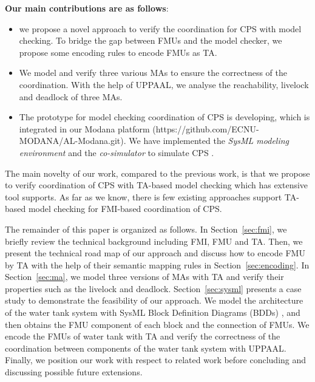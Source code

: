 \textbf{Our main contributions are as follows}:
\begin{itemize}
\item
we propose a novel approach to verify the coordination for CPS with model checking. To bridge the gap between FMUs and the model checker, we propose some encoding rules to encode FMUs as TA.
\item
We model and verify three various MAs to ensure the correctness of the coordination. With the help of UPPAAL, we analyse the reachability, livelock and deadlock of three MAs.
\item
The prototype for model checking coordination of CPS is developing, which is integrated in our Modana platform \cite{Cheng2015Modana}(https://github.com/ECNU-MODANA/AL-Modana.git). We have implemented the \textit{SysML modeling environment} and the \textit{co-simulator} to simulate CPS \cite{Fritzson1998Modelica}.
\end{itemize}
The main novelty of our work, compared to the previous work, is that we propose to verify coordination of CPS with TA-based model checking which has extensive tool supports. As far as we know, there is few existing approaches support TA-based model checking for FMI-based coordination of CPS.

The remainder of this paper is organized as follows. In Section~\ref{sec:fmi}, we briefly review the technical background including FMI, FMU and TA. Then, we present the technical road map of our approach and discuss how to encode FMU by TA with the help of their semantic mapping rules in Section~\ref{sec:encoding}. In Section~\ref{sec:ma}, we model three versions of MAs with TA and verify their properties such as the livelock and deadlock. Section~\ref{sec:sysml} presents a case study to demonstrate the feasibility of our approach. We model the architecture of the water tank system with SysML Block Definition Diagrams (BDDs) \cite{SemerathBHSV17}, and then obtains the FMU component of each block and the connection of FMUs. We encode the FMUs of water tank with TA and verify the correctness of the coordination between components of the water tank system with UPPAAL. Finally, we position our work with respect to related work before concluding and discussing possible future extensions.




















